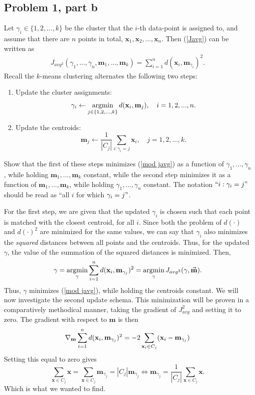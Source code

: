 \subsection{Problem 1, part b}
Let $\gamma_i \in \{1, 2, ..., k\}$ be the cluster that the $i$-th data-point is assigned to, and assume that there are $n$ points in total, $\textbf{x}_1, \textbf{x}_2, ..., \textbf{x}_n$. Then (\ref{Javg}) can be written as 
\begin{align}
    J_{avg^2}(\gamma_1, ..., \gamma_n, \textbf{m}_1, ..., \textbf{m}_k) = \sum_{i = 1}^n d(\textbf{x}_i, \textbf{m}_{\gamma_i})^2.\label{mod javg}
\end{align}
Recall the $k$-means clustering alternates the following two steps:
\begin{enumerate}
    \item Update the cluster assignments:
    \[\gamma_i \leftarrow \operatorname*{argmin}_{j \in \{1, 2, ..., k\}} d(\textbf{x}_i, \textbf{m}_j), \quad i = 1, 2, ..., n.\]
    \item Update the centroids:
    \[\textbf{m}_j \leftarrow \frac{1}{|C_j|} \sum_{i : \gamma_i = j} \textbf{x}_i, \quad j = 1, 2, ..., k. \]
\end{enumerate}
Show that the first of these steps minimizes (\ref{mod javg}) as a function of $\gamma_1, ..., \gamma_n$, while holding $\textbf{m}_1, ..., \textbf{m}_k$ constant, while the second step minimizes it as a function of $\textbf{m}_1, ..., \textbf{m}_k$, while holding $\gamma_1, ..., \gamma_n$ constant. The notation $`` i : \gamma_i = j"$ should be read as ``all $i$ for which $\gamma_i = j"$. 
\partbreak
\begin{solution}

    For the first step, we are given that the updated $\gamma_i$ is chosen such that each point is matched with the closest centroid, for all $i$. Since both the problem of $d(\cdot)$ and $d(\cdot)^2$ are minimized for the same values, we can say that $\gamma_i$ also minimizes the \textit{squared} distances between all points and the centroids. Thus, for the updated $\gamma$, the value of the summation of the squared distances is minimized. Then,
    \[\gamma = \operatorname*{argmin}_\gamma \sum_{i = 1}^n d(\textbf{x}_i, \textbf{m}_{\gamma_j})^2 = \operatorname*{argmin}_\gamma J_{avg^2}(\gamma, \Vec{\textbf{m}}).\]
    Thus, $\gamma$ minimizes (\ref{mod javg}), while holding the centroids constant. We will now investigate the second update schema. This minimization will be proven in a comparatively methodical manner, taking the gradient of $J_{avg}^2$ and setting it to zero. The gradient with respect to $\textbf{m}$ is then
    \[\nabla_\textbf{m} \sum_{i = 1}^n d(\textbf{x}_i, \textbf{m}_{\gamma_j})^2 = -2\sum_{\textbf{x}_i \in C_j} (\textbf{x}_i - \textbf{m}_{\gamma_j})\]
    \newpage
    Setting this equal to zero gives
    \[\sum_{\textbf{x} \in C_j} \textbf{x} = \sum_{\textbf{x}\in C_j} \textbf{m}_{\gamma_j} =|C_j|\textbf{m}_{\gamma_j} \iff \textbf{m}_{\gamma_j} = \frac{1}{|C_j|}\sum_{\textbf{x} \in C_j} \textbf{x}.\]
    Which is what we wanted to find.
\end{solution}

